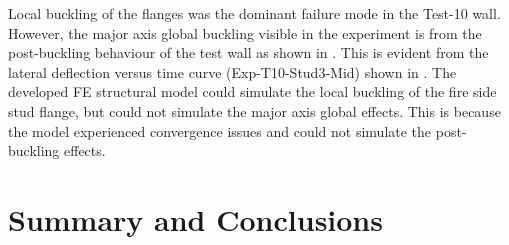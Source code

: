 Local buckling of the flanges was the dominant failure mode in the Test-10 wall. However, the major axis global buckling visible in the experiment is from the post-buckling behaviour of the test wall as shown in . This is evident from the lateral deflection versus time curve (Exp-T10-Stud3-Mid) shown in . The developed FE structural model could simulate the local buckling of the fire side stud flange, but could not simulate the major axis global effects. This is because the model experienced convergence issues and could not simulate the post-buckling effects.  

\section{Summary and Conclusions}


